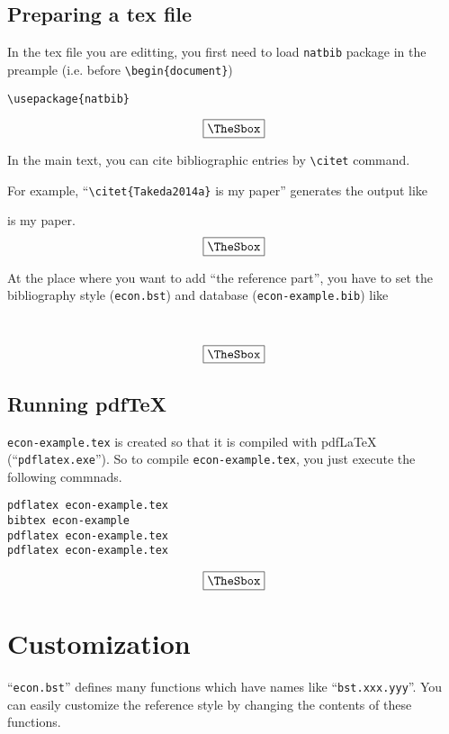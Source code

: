 \documentclass[10pt]{article}
\newenvironment{Frame}%
{\setlength{\fboxsep}{15pt}
\setlength{\mylength}{\linewidth}%
\addtolength{\mylength}{-2\fboxsep}%
\addtolength{\mylength}{-2\fboxrule}%
\Sbox
\minipage{\mylength}%
\setlength{\abovedisplayskip}{0pt}%
\setlength{\belowdisplayskip}{0pt}%
}%
{\endminipage\endSbox
\[\fbox{\TheSbox}\]}
\begin{document}
\subsection{Preparing a tex file}

In the tex file you are editting, you first need to load \texttt{natbib}
package in the preample (i.e. before \verb|\begin{document}|)
\begin{Frame}
\begin{verbatim}
\usepackage{natbib}
\end{verbatim}
\end{Frame}

In the main text, you can cite bibliographic entries by \verb|\citet|
command.

For example, ``\verb|\citet{Takeda2014a}| is my paper'' generates the output like
\begin{Frame}
\citet{Takeda2014a} is my paper.
\end{Frame}

At the place where you want to add ``the reference part'', you have to set the
bibliography style (\texttt{econ.bst}) and database (\texttt{econ-example.bib}) like
\begin{Frame}
\begin{verbatim}


\end{verbatim}
\end{Frame}

\subsection{Running pdf\TeX{}}

\texttt{econ-example.tex} is created so that it is compiled with pdf\LaTeX
(``\texttt{pdflatex.exe}''). So to compile \texttt{econ-example.tex}, you just
execute the following commnads.
\begin{Frame}
\begin{verbatim}
pdflatex econ-example.tex
bibtex econ-example
pdflatex econ-example.tex
pdflatex econ-example.tex
\end{verbatim}
\end{Frame}

\section{Customization}

``\texttt{econ.bst}'' defines many functions which have names like
``\texttt{bst.xxx.yyy}''.  You can easily customize the reference style by
changing the contents of these functions.
\end{document}
